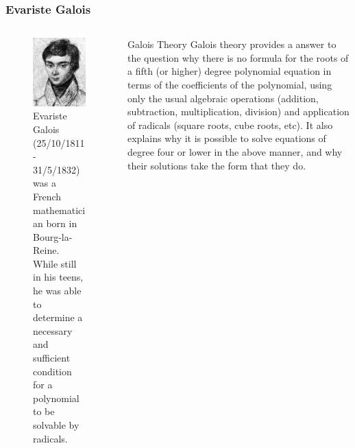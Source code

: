 \begin{frame}
	\frametitle{Evariste Galois}
	\begin{columns}
		\begin{column}{0.4\textwidth}
			\begin{figure}
				\centering
				\includegraphics[width=0.7\linewidth]{Images/Evariste_galois}
				\caption{\tiny{Evariste Galois (25/10/1811 - 31/5/1832) was a French mathematician born in Bourg-la-Reine. While still in his teens, he was able to determine a necessary and sufficient condition for a polynomial to be solvable by radicals.}}
			\end{figure}
		\end{column}
		\begin{column}{0.6 \textwidth}
			\begin{block}{Galois Theory}
				\footnotesize{
				Galois theory provides a answer to the question why there is no formula for the roots of a fifth (or higher) degree polynomial equation in terms of the coefficients of the polynomial, using only the usual algebraic operations (addition, subtraction, multiplication, division) and application of radicals (square roots, cube roots, etc). It also explains why it is possible to solve equations of degree four or lower in the above manner, and why their solutions take the form that they do.}
			\end{block}
		\end{column}
	\end{columns}

\end{frame}
